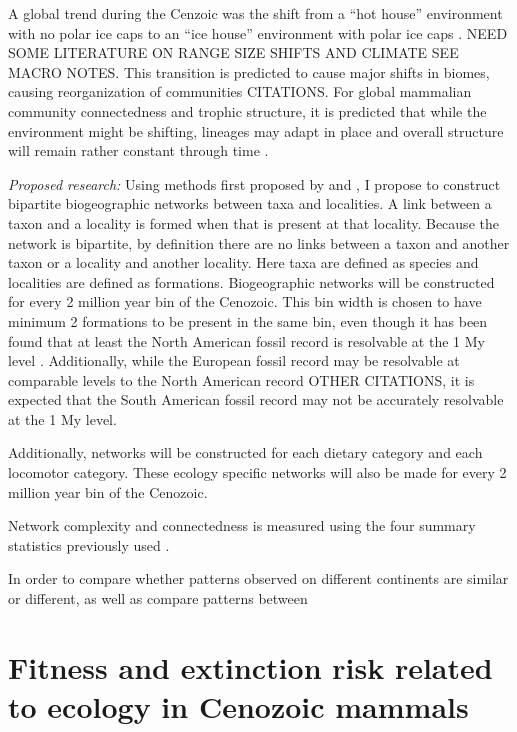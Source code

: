 \documentclass[12pt,letterpaper]{article}
\begin{document}
A global trend during the Cenzoic was the shift from a ``hot house'' environment with no polar ice caps to an ``ice house'' environment with polar ice caps \citep{Zachos2008,Zachos2001}. NEED SOME LITERATURE ON RANGE SIZE SHIFTS AND CLIMATE SEE MACRO NOTES. This transition is predicted to cause major shifts in biomes, causing reorganization of communities CITATIONS. For global mammalian community connectedness and trophic structure, it is predicted that while the environment might be shifting, lineages may adapt in place and overall structure will remain rather constant through time \citep{Jernvall2004}.

\textit{Proposed research:}
Using methods first proposed by \citet{Sidor2013} and \citet{Vilhena2013}, I propose to construct bipartite biogeographic networks between taxa and localities. A link between a taxon and a locality is formed when that is present at that locality. Because the network is bipartite, by definition there are no links between a taxon and another taxon or a locality and another locality. Here taxa are defined as species and localities are defined as formations. Biogeographic networks will be constructed for every 2 million year bin of the Cenozoic. This bin width is chosen to have minimum 2 formations to be present in the same bin, even though it has been found that at least the North American fossil record is resolvable at the 1 My level \citep{Alroy2000a,Alroy1996a,Alroy1998}. Additionally, while the European fossil record may be resolvable at comparable levels to the North American record \citep{Jernvall2002,Jernvall2004} OTHER CITATIONS, it is expected that the South American fossil record may not be accurately resolvable at the 1 My level.

Additionally, networks will be constructed for each dietary category and each locomotor category. These ecology specific networks will also be made for every 2 million year bin of the Cenozoic.

Network complexity and connectedness is measured using the four summary statistics previously used \citep{Sidor2013}.

In order to compare whether patterns observed on different continents are similar or different, as well as compare patterns between 


\section{Fitness and extinction risk related to ecology in Cenozoic mammals}
\end{document}
